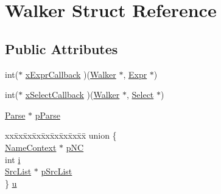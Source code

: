 \hypertarget{struct_walker}{\section{Walker Struct Reference}
\label{struct_walker}
}
\subsection*{Public Attributes}
\begin{DoxyCompactItemize}
\item 
int($\ast$ \hyperlink{struct_walker_a6f4d546e4aea8e6ff1f9512e9190d411}{x\-Expr\-Callback} )(\hyperlink{struct_walker}{Walker} $\ast$, \hyperlink{struct_expr}{Expr} $\ast$)
\item 
int($\ast$ \hyperlink{struct_walker_a2850c95c634f9439bb403f0bb211c636}{x\-Select\-Callback} )(\hyperlink{struct_walker}{Walker} $\ast$, \hyperlink{struct_select}{Select} $\ast$)
\item 
\hyperlink{struct_parse}{Parse} $\ast$ \hyperlink{struct_walker_ac6e8e756b5da8f187b9cf6b94560f352}{p\-Parse}
\item 
\begin{tabbing}
xx\=xx\=xx\=xx\=xx\=xx\=xx\=xx\=xx\=\kill
union \{\\
\>\hyperlink{struct_name_context}{NameContext} $\ast$ \hyperlink{struct_walker_adbf5872a6c5a9311adbfe01c0e444388}{pNC}\\
\>int \hyperlink{struct_walker_a32ef15f76242c0688e243a27b4decd63}{i}\\
\>\hyperlink{struct_src_list}{SrcList} $\ast$ \hyperlink{struct_walker_aa09fe5df040b732226cdae1bff741e0d}{pSrcList}\\
\} \hyperlink{struct_walker_a30cf7b40250ecfae7c23f27f67e6a5b6}{u}\\

\end{tabbing}\end{DoxyCompactItemize}


